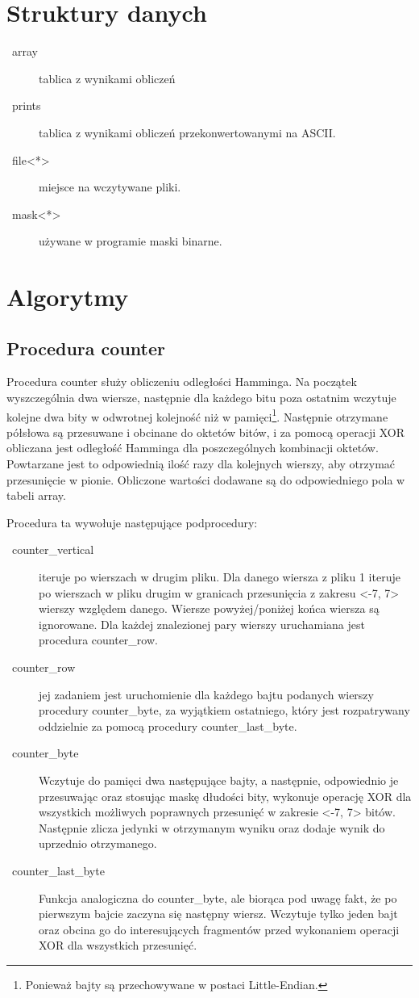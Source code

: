 \documentclass{article}
\newcommand\bitem[1]{\item[\textbullet~#1]}
\begin{document}
\section{Struktury danych}
\begin{description}
 \bitem{array} tablica z wynikami obliczeń
 \bitem{prints} tablica z wynikami obliczeń przekonwertowanymi na ASCII.
 \bitem{file<*>} miejsce na wczytywane pliki.
 \bitem{mask<*>} używane w programie maski binarne.
\end{description}

\section{Algorytmy}
\subsection{Procedura counter}
Procedura counter służy obliczeniu odległości Hamminga. Na początek wyszczególnia dwa wiersze, następnie dla każdego bitu poza ostatnim  
wczytuje kolejne dwa bity w odwrotnej kolejność niż w pamięci\footnote{Ponieważ bajty są przechowywane w postaci Little-Endian.}.
Następnie otrzymane półsłowa są przesuwane i obcinane do oktetów bitów, i za pomocą operacji XOR obliczana jest odległość Hamminga dla
poszczególnych kombinacji oktetów. Powtarzane jest to odpowiednią ilość razy dla kolejnych wierszy, aby otrzymać przesunięcie w pionie.
Obliczone wartości dodawane są do odpowiedniego pola w tabeli array.

Procedura ta wywołuje następujące podprocedury:
\begin{description}
 \bitem{counter\_vertical} iteruje po wierszach w drugim pliku. Dla danego wiersza z pliku 1 iteruje po wierszach w pliku
 drugim w granicach przesunięcia z zakresu <-7, 7> wierszy względem danego. Wiersze powyżej/poniżej końca wiersza są ignorowane.
 Dla każdej znalezionej pary wierszy uruchamiana jest procedura counter\_row.
 \bitem{counter\_row} jej zadaniem jest uruchomienie dla każdego bajtu podanych wierszy procedury counter\_byte, za wyjątkiem ostatniego,
 który jest rozpatrywany oddzielnie za pomocą procedury counter\_last\_byte.
 \bitem{counter\_byte} Wczytuje do pamięci dwa następujące bajty, a następnie, odpowiednio je przesuwając oraz stosując maskę dłudości bity,
 wykonuje operację XOR dla wszystkich możliwych poprawnych przesunięć w zakresie <-7, 7> bitów. Następnie zlicza jedynki w otrzymanym
 wyniku oraz dodaje wynik do uprzednio otrzymanego.
 \bitem{counter\_last\_byte} Funkcja analogiczna do counter\_byte, ale biorąca pod uwagę fakt, że po pierwszym bajcie zaczyna się następny wiersz.
 Wczytuje tylko jeden bajt oraz obcina go do interesujących fragmentów przed wykonaniem operacji XOR dla wszystkich przesunięć.
\end{description}
\end{document}
